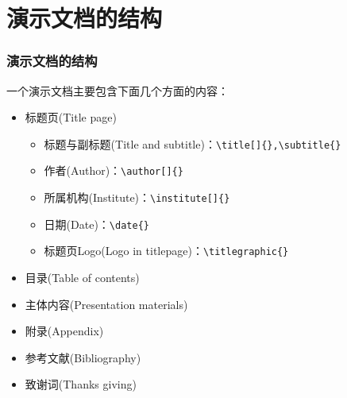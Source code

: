 \documentclass{beamer}
\begin{document}
\section{演示文档的结构}
\begin{frame}[containsverbatim]
\frametitle{演示文档的结构}
一个演示文档主要包含下面几个方面的内容：
\begin{itemize}
\item 标题页(Title page)
\begin{itemize}
\item 标题与副标题(Title and subtitle)：\verb|\title[]{},\subtitle{}|
\item 作者(Author)：\verb|\author[]{}|
\item 所属机构(Institute)：\verb|\institute[]{}|
\item 日期(Date)：\verb|\date{}|
\item 标题页Logo(Logo in titlepage)：\verb|\titlegraphic{}|
\end{itemize}
\item 目录(Table of contents)
\item 主体内容(Presentation materials)
\item 附录(Appendix)
\item 参考文献(Bibliography)
\item 致谢词(Thanks giving)
\end{itemize}
\end{frame}

\end{document}

